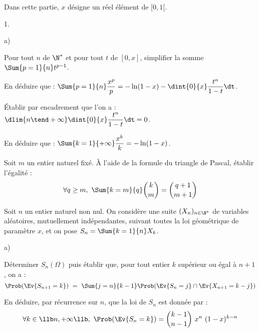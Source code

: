 \noindent
Dans cette partie, $x$ désigne un réel élément de $[0,1[$.
\begin{noliste}{1.}
  \setlength{\itemsep}{4mm}
\item
  \begin{noliste}{a)}
    \setlength{\itemsep}{2mm}
  \item Pour tout $n$ de $\N^*$ et pour tout $t$ de $[0,x]$,
    simplifier la somme $\Sum{p = 1}{n} t^{p-1}$.

    




  \item En déduire que : $\Sum{p = 1}{n}\dfrac{x^{p}}{p} = - \ln(1-x)
    - \dint{0}{x} \dfrac{t^n}{1-t} \dt$.

    

  \item Établir par encadrement que l'on a : $\dlim{n \tend +\infty}
    \dint{0}{x} \dfrac{t^n}{1-t} \dt = 0$.
    

  \item En déduire que : $\Sum{k = 1}{+ \infty}\dfrac{x^k}{k} =
    -\ln(1-x)$.

    

  \end{noliste}




\item Soit $m$ un entier naturel fixé. À l'aide de la formule du
  triangle de Pascal, établir l'égalité :
  \[
  \forall q \geq m, \ \Sum{k = m}{q} \dbinom{k}{m} = \dbinom{q + 1}{m
    + 1}
  \]

  
  
\item Soit $n$ un entier naturel non nul. On considère une suite
  $(X_n)_{n\in\N^{*}}$ de variables aléatoires, mutuellement
  indépendantes, suivant toutes la loi géométrique de paramètre $x$,
  et on pose $S_n = \Sum{k = 1}{n}X_k$.
  \begin{noliste}{a)}
    \setlength{\itemsep}{2mm}
  \item Déterminer $S_n(\Omega)$ puis établir que, pour tout entier
    $k$ supérieur ou égal à $n + 1$, on a :
    \[
    \Prob(\Ev{S_{n + 1} = k}) \ = \ \Sum{j = n}{k-1} \Prob(\Ev{S_n =
      j} \cap \Ev{X_{n + 1} = k-j})
    \]

    

  \item En déduire, par récurrence sur $n$, que la loi de $S_n$ est
    donnée par :
    \[
    \forall k \in \llb n, + \infty \llb, \ \Prob(\Ev{S_n = k}) =
    \dbinom{k-1}{n-1} \ x^n \ (1-x)^{k-n}
    \]


\end{noliste}
\end{noliste}
